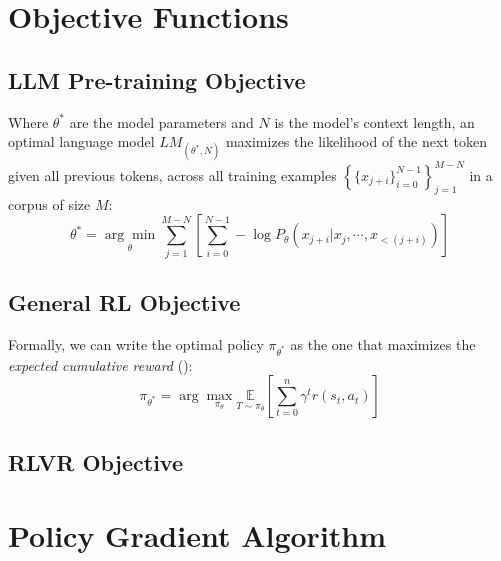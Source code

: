 \documentclass{article} %
\theoremstyle{definition}
\begin{document}


\appendix
\section{Objective Functions}
\subsection{LLM Pre-training Objective}

Where $\theta^{*}$ are the model parameters and $N$ is the model's context length, 
an optimal language model $LM_{(\theta^{*}, N)}$
maximizes the likelihood of the next token given all previous tokens, across all training examples
$\left\{\{x_{j + i}\}_{i = 0}^{N - 1}\right\}_{j = 1}^{M - N}$ 
in a corpus of size $M$:
\begin{equation} \label{eq:pretrain-obj}
    \theta^{*} = \underset{\theta}{\arg\min} \sum_{j = 1}^{M - N} \left[\sum_{i = 0}^{N - 1} -\log P_{\theta}(x_{j + i} | x_j, \cdots, x_{< (j + i)})\right]
\end{equation}

\subsection{General RL Objective}
Formally, we can write the optimal policy $\pi_{\theta^{*}}$ as the one that maximizes the \textit{expected cumulative reward} (\cite{wk2}):
\begin{equation} \label{eq:rl-obj}
    \pi_{\theta^{*}} = {\displaystyle \arg\max_{\pi_\theta} \underset{T \sim \pi_{\theta}}{\mathbb{E}} \left[ \sum_{t=0}^{n} \gamma^t r(s_t, a_t) \right] }
\end{equation}

\subsection{RLVR Objective}

\section{Policy Gradient Algorithm}
\end{document}
